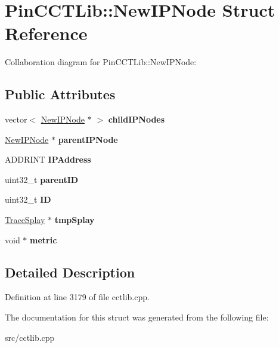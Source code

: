 \hypertarget{structPinCCTLib_1_1NewIPNode}{\section{Pin\-C\-C\-T\-Lib\-:\-:New\-I\-P\-Node Struct Reference}
\label{structPinCCTLib_1_1NewIPNode}
}


Collaboration diagram for Pin\-C\-C\-T\-Lib\-:\-:New\-I\-P\-Node\-:
\subsection*{Public Attributes}
\begin{DoxyCompactItemize}
\item 
\hypertarget{structPinCCTLib_1_1NewIPNode_a472aaebd7df6a5d38c59c900571c5fbb}{vector$<$ \hyperlink{structPinCCTLib_1_1NewIPNode}{New\-I\-P\-Node} $\ast$ $>$ {\bfseries child\-I\-P\-Nodes}}\label{structPinCCTLib_1_1NewIPNode_a472aaebd7df6a5d38c59c900571c5fbb}

\item 
\hypertarget{structPinCCTLib_1_1NewIPNode_ace77a40e5649e071d498224c91ddfe61}{\hyperlink{structPinCCTLib_1_1NewIPNode}{New\-I\-P\-Node} $\ast$ {\bfseries parent\-I\-P\-Node}}\label{structPinCCTLib_1_1NewIPNode_ace77a40e5649e071d498224c91ddfe61}

\item 
\hypertarget{structPinCCTLib_1_1NewIPNode_a0d2dc2a76e6c0eb5ba45892610a2d632}{A\-D\-D\-R\-I\-N\-T {\bfseries I\-P\-Address}}\label{structPinCCTLib_1_1NewIPNode_a0d2dc2a76e6c0eb5ba45892610a2d632}

\item 
\hypertarget{structPinCCTLib_1_1NewIPNode_a44ae63d4feb43eda99ff662f8859f790}{uint32\-\_\-t {\bfseries parent\-I\-D}}\label{structPinCCTLib_1_1NewIPNode_a44ae63d4feb43eda99ff662f8859f790}

\item 
\hypertarget{structPinCCTLib_1_1NewIPNode_a015b3c663f80536013782bde977cd408}{uint32\-\_\-t {\bfseries I\-D}}\label{structPinCCTLib_1_1NewIPNode_a015b3c663f80536013782bde977cd408}

\item 
\hypertarget{structPinCCTLib_1_1NewIPNode_a1dab7314258c785f85fe45edb106ad14}{\hyperlink{structPinCCTLib_1_1TraceSplay}{Trace\-Splay} $\ast$ {\bfseries tmp\-Splay}}\label{structPinCCTLib_1_1NewIPNode_a1dab7314258c785f85fe45edb106ad14}

\item 
\hypertarget{structPinCCTLib_1_1NewIPNode_a0e7fa7786b5d4c125a3da1483af36993}{void $\ast$ {\bfseries metric}}\label{structPinCCTLib_1_1NewIPNode_a0e7fa7786b5d4c125a3da1483af36993}

\end{DoxyCompactItemize}


\subsection{Detailed Description}


Definition at line 3179 of file cctlib.\-cpp.



The documentation for this struct was generated from the following file\-:\begin{DoxyCompactItemize}
\item 
src/cctlib.\-cpp\end{DoxyCompactItemize}
